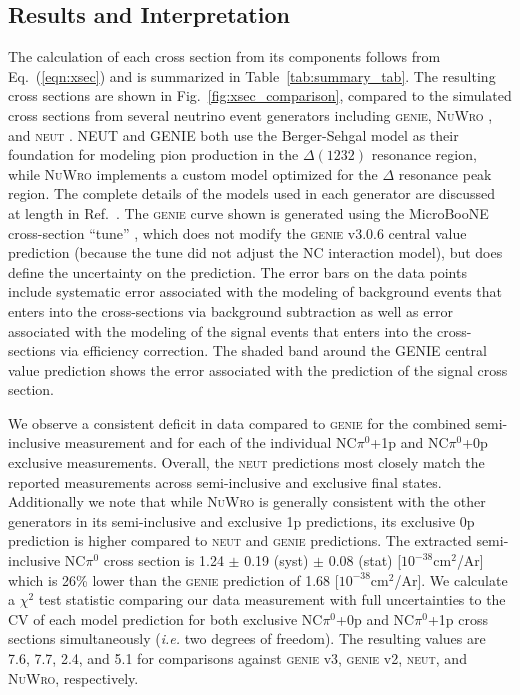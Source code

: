 \subsection{Results and Interpretation}

The calculation of each cross section from its components follows from Eq.~(\ref{eqn:xsec}) and is summarized in Table~\ref{tab:summary_tab}. The resulting cross sections are shown in Fig.~\ref{fig:xsec_comparison}, compared to the simulated cross sections from several neutrino event generators including \textsc{genie}, \textsc{NuWro} \cite{Golan:2012rfa}, and \textsc{neut} \cite{Hayato:2002sd}. \textsc{NEUT} and \textsc{GENIE} both use the Berger-Sehgal model as their foundation for modeling pion production in the $\Delta(1232)$ resonance region, while \textsc{NuWro} implements a custom model optimized for the $\Delta$ resonance peak region. The complete details of the models used in each generator are discussed at length in Ref.~\cite{Avanzini:2021qlx}. The \textsc{genie} curve shown is generated using the MicroBooNE cross-section ``tune'' \cite{MicroBooNE:2021ccs}, which does not modify the \textsc{genie} v3.0.6 central value prediction (because the tune did not adjust the NC interaction model), but does define the uncertainty on the prediction. The error bars on the data points include systematic error associated with the modeling of background events that enters into the cross-sections via background subtraction as well as error associated with the modeling of the signal events that enters into the cross-sections via efficiency correction. The shaded band around the \textsc{GENIE} central value prediction shows the error associated with the prediction of the signal cross section. 

We observe a consistent deficit in data compared to \textsc{genie} for the combined semi-inclusive measurement and for each of the individual NC$\pi^{0}$+1p and NC$\pi^{0}$+0p exclusive measurements. Overall, the \textsc{neut} predictions most closely match the reported measurements across semi-inclusive and exclusive final states. Additionally we note that while \textsc{NuWro} is generally consistent with the other generators in its semi-inclusive and exclusive 1p predictions, its exclusive 0p prediction is higher compared to \textsc{neut} and \textsc{genie} predictions. The extracted semi-inclusive NC$\pi^{0}$ cross section is 1.24 $\pm$ 0.19 (syst) $\pm$ 0.08 (stat) [$10^{-38}$cm$^2$/Ar] which is 26\% lower than the \textsc{genie} prediction of 1.68 [$10^{-38}$cm$^2$/Ar]. We calculate a $\chi^2$ test statistic comparing our data measurement with full uncertainties to the CV of each model prediction for both exclusive NC$\pi^0$+0p and NC$\pi^0$+1p cross sections simultaneously (\textit{i.e.} two degrees of freedom). The resulting values are 7.6, 7.7, 2.4, and 5.1 for comparisons against \textsc{genie} v3, \textsc{genie} v2, \textsc{neut}, and \textsc{NuWro}, respectively.

